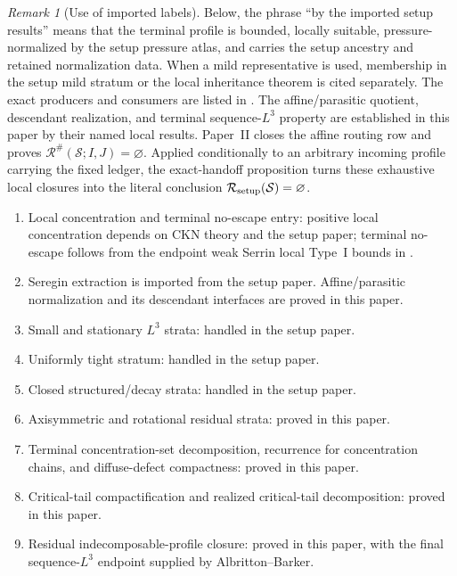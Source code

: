 \documentclass[11pt]{amsart}
\numberwithin{equation}{section}
\theoremstyle{plain}
\theoremstyle{definition}
\theoremstyle{remark}
\newtheorem{remark}[remark]{Remark}
\newcommand{\calS}{\mathcal S}
\newcommand{\calR}{\mathcal R}
\begin{document}
\begin{remark}[Use of imported labels]
\label{rem:imported-label-convention}
Below, the phrase ``by the imported setup results'' means that the terminal
profile is bounded, locally suitable, pressure-normalized by the setup pressure
atlas, and carries the setup ancestry and retained normalization data.  When a
mild representative is used, membership in the setup mild stratum or the
local inheritance theorem is cited separately.  The exact producers and
consumers are listed in
.  The
affine/parasitic quotient, descendant realization, and terminal sequence-\(L^3\)
property are established in this paper by their named local results.  Paper~II
closes the affine routing row and proves
\(\calR^\#(\calS;I,J)=\varnothing\).  Applied conditionally to an arbitrary
incoming profile carrying the fixed ledger, the exact-handoff proposition
turns these exhaustive local closures into the literal conclusion
\(\calR_{\rm setup}(\calS)=\varnothing\).
\end{remark}

\begin{enumerate}[label=\textup{(\arabic*)},leftmargin=2.2em]
   \item Local concentration and terminal no-escape entry: positive local
   concentration depends on CKN theory and the setup paper; terminal no-escape follows
   from the endpoint weak Serrin local Type~I bounds in
   .
   \item Seregin extraction is imported from the setup paper.  Affine/parasitic
   normalization and its descendant interfaces are proved in this paper.
   \item Small and stationary \(L^3\) strata: handled in the setup paper.
   \item Uniformly tight stratum: handled in the setup paper.
   \item Closed structured/decay strata: handled in the setup paper.
   \item Axisymmetric and rotational residual strata: proved in this paper.
   \item Terminal concentration-set decomposition, recurrence for concentration chains, and
   diffuse-defect compactness: proved in this paper.
   \item Critical-tail compactification and realized critical-tail
   decomposition: proved in this paper.
   \item Residual indecomposable-profile closure: proved in this paper, with
   the final sequence-\(L^3\) endpoint supplied by Albritton--Barker.
\end{enumerate}
\end{document}
